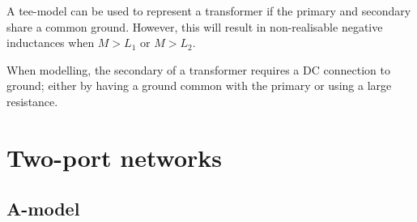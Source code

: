 \documentclass[a4paper, 12pt]{article}
\begin{document}
A tee-model can be used to represent a transformer if the primary and
secondary share a common ground.  However, this will result in
non-realisable negative inductances when $M > L_1$ or $M > L_2$.


When modelling, the secondary of a transformer requires a DC
connection to ground; either by having a ground common with the
primary or using a large resistance.



\section{Two-port networks}


\subsection{A-model}
\end{document}
